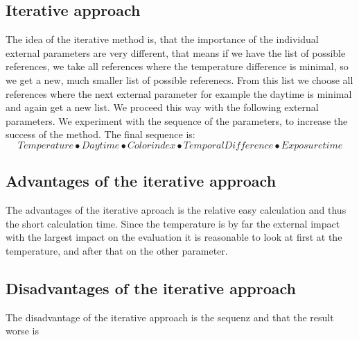 \documentclass  [
  paper    = a4,
  BCOR     = 10mm,
  twoside,
  fontsize = 12pt,
  fleqn,
  toc      = bibnumbered,
  toc      = listofnumbered,
  numbers  = noendperiod,
  headings = normal,
  listof   = leveldown,
  version  = 3.03
]                                       {scrreprt}
\begin{document}
	\subsection{Iterative approach}

	The idea of the iterative method is, that the importance of the individual external parameters are very different, that means if we have the list of possible references, we take all references where the temperature difference is minimal, so we get a new, much smaller list of possible referenecs. From this list we choose all references where the next external parameter for example the daytime is minimal and again get a new list. We proceed this way with the following external parameters. We experiment with the sequence of the parameters, to increase the success of the method. The final sequence is:
	\begin{equation*}
	Temperature \bullet  Daytime  \bullet Colorindex \bullet Temporal Difference \bullet Exposure time
	\end{equation*} 
	\subsection*{Advantages of the iterative approach}
	The advantages of the iterative aproach is the relative easy calculation and thus the short calculation time. Since the temperature is by far the external impact with the largest impact on the evaluation 	it is reasonable to look at first at the temperature, and after that on the other parameter. 
	\subsection*{Disadvantages of the iterative approach}
	The disadvantage of the iterative approach is the sequenz and that the result worse is

	
\end{document}
